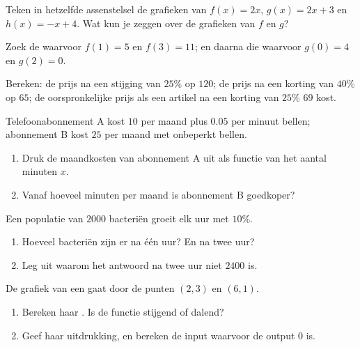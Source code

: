 \begin{exercise}[$\star$]\label{exo:g9:linfunc:4}
Teken in hetzelfde assenstelsel de grafieken van $f(x) = 2x$, $g(x) = 2x + 3$ en
$h(x) = -x + 4$. Wat kun je zeggen over de grafieken van $f$ en $g$?
\end{exercise}

\begin{exercise}[$\star$]\label{exo:g9:linfunc:5}
Zoek de  waarvoor $f(1) = 5$ en $f(3) = 11$; en daarna die
waarvoor $g(0) = 4$ en $g(2) = 0$.
\end{exercise}

\begin{exercise}[$\star\star$]\label{exo:g9:linfunc:6}
Bereken: de prijs na een stijging van $25\%$ op $120$; de prijs na een korting van
$40\%$ op $65$; de oorspronkelijke prijs als een artikel na een korting van $25\%$
$69$ kost.
\end{exercise}

\begin{exercise}[$\star\star$]\label{exo:g9:linfunc:7}
Telefoonabonnement A kost $10$ per maand plus $0.05$ per minuut bellen;
abonnement B kost $25$ per maand met onbeperkt bellen.
\begin{enumerate}
  \item Druk de maandkosten van abonnement A uit als functie van het aantal
        minuten $x$.
  \item Vanaf hoeveel minuten per maand is abonnement B goedkoper?
\end{enumerate}
\end{exercise}

\begin{exercise}[$\star\star$]\label{exo:g9:linfunc:8}
Een populatie van $2000$ bacteriën groeit elk uur met $10\%$.
\begin{enumerate}
  \item Hoeveel bacteriën zijn er na één uur? En na twee uur?
  \item Leg uit waarom het antwoord na twee uur niet $2400$ is.
\end{enumerate}
\end{exercise}

\begin{exercise}[$\star\star$]\label{exo:g9:linfunc:9}
De grafiek van een  gaat door de punten $(2, 3)$ en $(6, 1)$.
\begin{enumerate}
  \item Bereken haar . Is de functie stijgend of dalend?
  \item Geef haar uitdrukking, en bereken de input waarvoor de output $0$ is.
\end{enumerate}
\end{exercise}

